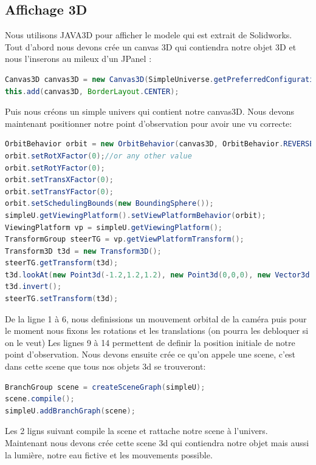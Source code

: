 \documentclass[a4paper,11pt]{report}
\begin{document}
		\subsection{Affichage 3D}
			\label{subsec:Affichage 3D}
			Nous utilisons JAVA3D pour afficher le modele qui est extrait de Solidworks.
			\newline Tout d'abord nous devons crée un canvas 3D qui contiendra notre objet 3D et nous l'inserons au mileux d'un JPanel :
		\begin{lstlisting}[language=java]
Canvas3D canvas3D = new Canvas3D(SimpleUniverse.getPreferredConfiguration());
this.add(canvas3D, BorderLayout.CENTER);
		\end{lstlisting}
		Puis nous créons un simple univers qui contient notre canvas3D.
		\newline Nous devons maintenant positionner notre point d'observation pour avoir une vu correcte:
		\begin{lstlisting}[language=java]
OrbitBehavior orbit = new OrbitBehavior(canvas3D, OrbitBehavior.REVERSE_ROTATE);
orbit.setRotXFactor(0);//or any other value
orbit.setRotYFactor(0);
orbit.setTransXFactor(0);
orbit.setTransYFactor(0);
orbit.setSchedulingBounds(new BoundingSphere());
simpleU.getViewingPlatform().setViewPlatformBehavior(orbit);
ViewingPlatform vp = simpleU.getViewingPlatform();
TransformGroup steerTG = vp.getViewPlatformTransform();
Transform3D t3d = new Transform3D();
steerTG.getTransform(t3d);
t3d.lookAt(new Point3d(-1.2,1.2,1.2), new Point3d(0,0,0), new Vector3d(0,1,0));
t3d.invert();
steerTG.setTransform(t3d);
		\end{lstlisting}
		De la ligne 1 à 6, nous definissions un mouvement orbital de la caméra puis pour le moment nous fixons les rotations et les translations (on pourra les debloquer si on le veut)
		\newline Les lignes 9 à 14 permettent de definir la position initiale de notre point d'observation.
		\newline Nous devons ensuite crée ce qu'on appele une scene, c'est dans cette scene que tous nos objets 3d se trouveront:
		\begin{lstlisting}[language=java]
BranchGroup scene = createSceneGraph(simpleU);
scene.compile();
simpleU.addBranchGraph(scene);
		\end{lstlisting}
		Les 2 ligns suivant compile la scene et rattache notre scene à l'univers.
		\newline \newline Maintenant nous devons crée cette scene 3d qui contiendra notre objet mais aussi la lumière, notre eau fictive et les mouvements possible.
\end{document}

